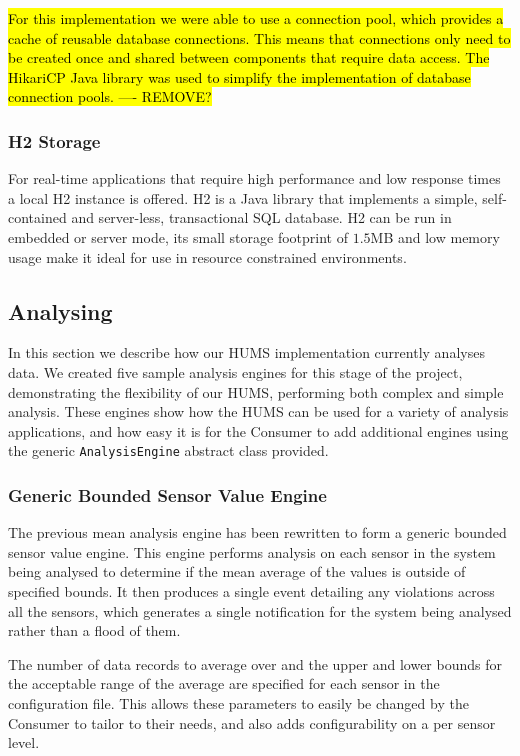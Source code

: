 \documentclass[10pt,a4paper]{article}
\begin{document}
\hl{For this implementation we were able to use a connection pool, which provides a cache of reusable database connections. This means that connections only need to be created once and shared between components that require data access. The HikariCP Java library was used to simplify the implementation of database connection pools. ---- REMOVE?}

\subsubsection{H2 Storage}
For real-time applications that require high performance and low response times a local H2 instance is offered. H2 is a Java library that implements a simple, self-contained and server-less, transactional SQL database. H2 can be run in embedded or server mode, its small storage footprint of $1.5$MB and low memory usage make it ideal for use in resource constrained environments. 


\subsection{Analysing}
\label{sec:analysis}
In this section we describe how our HUMS implementation currently analyses data. We created five sample analysis engines for this stage of the project, demonstrating the flexibility of our HUMS, performing both complex and simple analysis. These engines show how the HUMS can be used for a variety of analysis applications, and how easy it is for the Consumer to add additional engines using the generic \texttt{AnalysisEngine} abstract class provided.

\subsubsection{Generic Bounded Sensor Value Engine}

The previous mean analysis engine has been rewritten to form a generic bounded sensor value engine. This engine performs analysis on each sensor in the system being analysed to determine if the mean average of the values is outside of specified bounds. It then produces a single event detailing any violations across all the sensors, which generates a single notification for the system being analysed rather than a flood of them.

The number of data records to average over and the upper and lower bounds for the acceptable range of the average are specified for each sensor in the configuration file. This allows these parameters to easily be changed by the Consumer to tailor to their needs, and also adds configurability on a per sensor level.
\end{document}

